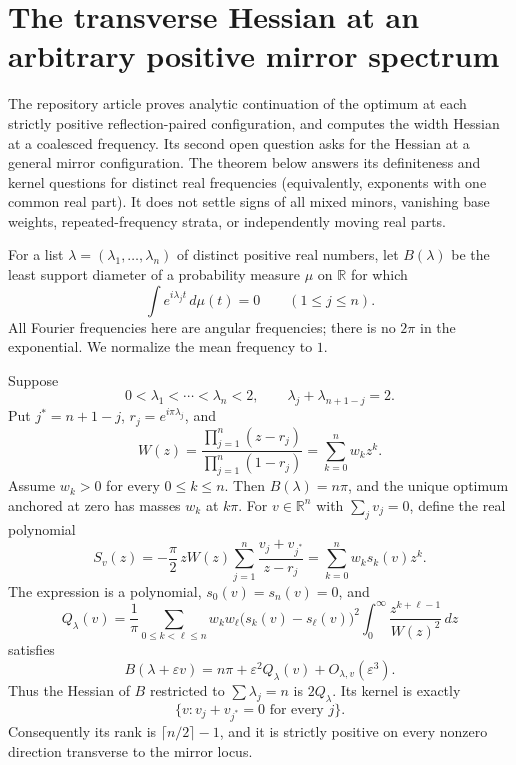 \section{The transverse Hessian at an arbitrary positive mirror spectrum}

The repository article \cite{ProveItFilters} proves analytic continuation of the optimum at each strictly
positive reflection-paired configuration, and computes the width Hessian at a
coalesced frequency. Its second open question asks for the Hessian at a
general mirror configuration. The theorem below answers its definiteness and
kernel questions for distinct real frequencies (equivalently, exponents with
one common real part). It does not settle signs of all mixed minors, vanishing
base weights, repeated-frequency strata, or independently moving real parts.

For a list $\lambda=(\lambda_1,\ldots,\lambda_n)$ of distinct positive real
numbers, let $B(\lambda)$ be the least support diameter of a probability
measure $\mu$ on $\mathbb R$ for which
\[
 \int e^{i\lambda_jt}\,d\mu(t)=0\qquad(1\leq j\leq n).
\]
All Fourier frequencies here are angular frequencies; there is no $2\pi$ in
the exponential. We normalize the mean frequency to $1$.

\clearpage
\begin{theorem}
Suppose
\[
 0<\lambda_1<\cdots<\lambda_n<2,\qquad
 \lambda_j+\lambda_{n+1-j}=2.
\]
Put $j^*=n+1-j$, $r_j=e^{i\pi\lambda_j}$, and
\[
 W(z)=\frac{\prod_{j=1}^n(z-r_j)}{\prod_{j=1}^n(1-r_j)}
      =\sum_{k=0}^n w_kz^k.
\]
Assume $w_k>0$ for every $0\leq k\leq n$. Then $B(\lambda)=n\pi$,
and the unique optimum anchored at zero has masses $w_k$ at $k\pi$.
For $v\in\mathbb R^n$ with $\sum_jv_j=0$, define the real polynomial
\begin{equation}\label{new:eq:S}
 S_v(z)=-\frac\pi2\,zW(z)
              \sum_{j=1}^n\frac{v_j+v_{j^*}}{z-r_j}
        =\sum_{k=0}^n w_ks_k(v)z^k.
\end{equation}
The expression is a polynomial, $s_0(v)=s_n(v)=0$, and
\begin{equation}\label{new:eq:Q}
 Q_\lambda(v)=\frac1\pi\sum_{0\leq k<\ell\leq n}
  w_kw_\ell\bigl(s_k(v)-s_\ell(v)\bigr)^2
  \int_0^\infty\frac{z^{k+\ell-1}}{W(z)^2}\,dz
\end{equation}
satisfies
\[
 B(\lambda+\varepsilon v)
       =n\pi+\varepsilon^2Q_\lambda(v)+O_{\lambda,v}(\varepsilon^3).
\]
Thus the Hessian of $B$ restricted to $\sum\lambda_j=n$ is $2Q_\lambda$.
Its kernel is exactly
\[
 \{v: v_j+v_{j^*}=0\text{ for every }j\}.
\]
Consequently its rank is $\lceil n/2\rceil-1$, and it is strictly positive
on every nonzero direction transverse to the mirror locus.
\end{theorem}

